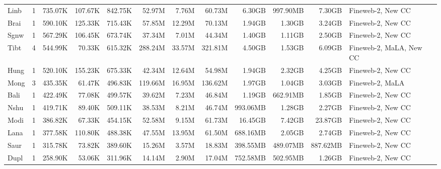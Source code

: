 \begin{table*}[!htp]
{\begin{tabular}{l|c|rrr|rrr|rrr|l}
Linb                    & 1                        & 735.07K  & 107.67K  & 842.75K & 52.97M  & 7.76M   & 60.73M  & 6.30GB   & 997.90MB & 7.30GB   & Fineweb-2, New CC              \\
Brai                    & 1                        & 590.10K  & 125.33K  & 715.43K & 57.85M  & 12.29M  & 70.13M  & 1.94GB   & 1.30GB   & 3.24GB   & Fineweb-2, New CC              \\
Sgnw                    & 1                        & 567.29K  & 106.45K  & 673.74K & 37.34M  & 7.01M   & 44.34M  & 1.40GB   & 1.11GB   & 2.50GB   & Fineweb-2, New CC              \\
Tibt                    & 4                        & 544.99K  & 70.33K   & 615.32K & 288.24M & 33.57M  & 321.81M & 4.50GB   & 1.53GB   & 6.09GB   & Fineweb-2, MaLA, New CC         \\
Hung                    & 1                        & 520.10K  & 155.23K  & 675.33K & 42.34M  & 12.64M  & 54.98M  & 1.94GB   & 2.32GB   & 4.25GB   & Fineweb-2, New CC              \\
Mong                    & 3                        & 435.35K  & 61.47K   & 496.83K & 119.66M & 16.95M  & 136.62M & 1.97GB   & 1.04GB   & 3.03GB   & Fineweb-2, MaLA                \\
Bali                    & 1                        & 422.49K  & 77.08K   & 499.57K & 39.62M  & 7.23M   & 46.84M  & 1.19GB   & 662.91MB & 1.85GB   & Fineweb-2, New CC              \\
Nshu                    & 1                        & 419.71K  & 89.40K   & 509.11K & 38.53M  & 8.21M   & 46.74M  & 993.06MB & 1.28GB   & 2.27GB   & Fineweb-2, New CC              \\
Modi                    & 1                        & 386.82K  & 67.33K   & 454.15K & 52.58M  & 9.15M   & 61.73M  & 16.45GB  & 7.42GB   & 23.87GB  & Fineweb-2, New CC              \\
Lana                    & 1                        & 377.58K  & 110.80K  & 488.38K & 47.55M  & 13.95M  & 61.50M  & 688.16MB & 2.05GB   & 2.74GB   & Fineweb-2, New CC              \\
Saur                    & 1                        & 315.78K  & 73.82K   & 389.60K & 15.26M  & 3.57M   & 18.83M  & 398.55MB & 489.07MB & 887.62MB & Fineweb-2, New CC              \\
Dupl                    & 1                        & 258.90K  & 53.06K   & 311.96K & 14.14M  & 2.90M   & 17.04M  & 752.58MB & 502.95MB & 1.26GB   & Fineweb-2, New CC              \\

\end{tabular}}
\end{table*}
